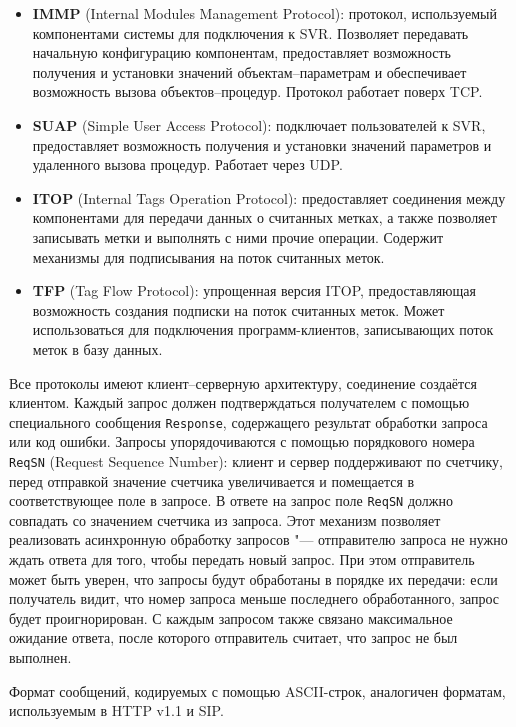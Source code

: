 \begin{itemize}
\item{\textbf{IMMP} (Internal Modules Management Protocol): протокол, используемый компонентами системы для подключения к SVR. Позволяет передавать начальную конфигурацию компонентам, предоставляет возможность получения и установки значений объектам--параметрам и обеспечивает возможность вызова объектов--процедур. Протокол работает поверх TCP.}
\item{\textbf{SUAP} (Simple User Access Protocol): подключает пользователей к SVR, предоставляет возможность получения и установки значений параметров и удаленного вызова процедур. Работает через UDP.}
\item{\textbf{ITOP} (Internal Tags Operation Protocol): предоставляет соединения между компонентами для передачи данных о считанных метках, а также позволяет записывать метки и выполнять с ними прочие операции. Содержит механизмы для подписывания на поток считанных меток.}
\item{\textbf{TFP} (Tag Flow Protocol): упрощенная версия ITOP, предоставляющая возможность создания подписки на поток считанных меток. Может использоваться для подключения программ-клиентов, записывающих поток меток в базу данных.}
\end{itemize}

Все протоколы имеют клиент--серверную архитектуру, соединение создаётся клиентом. Каждый запрос должен подтверждаться получателем с помощью специального сообщения \texttt{Response}, содержащего результат обработки запроса или код ошибки. Запросы упорядочиваются с помощью порядкового номера \texttt{ReqSN} (Request Sequence Number): клиент и сервер поддерживают по счетчику, перед отправкой значение счетчика увеличивается и помещается в соответствующее поле в запросе. В ответе на запрос поле \texttt{ReqSN} должно совпадать со значением счетчика из запроса. Этот механизм позволяет реализовать асинхронную обработку запросов "--- отправителю запроса не нужно ждать ответа для того, чтобы передать новый запрос. При этом отправитель может быть уверен, что запросы будут обработаны в порядке их передачи: если получатель видит, что номер запроса меньше последнего обработанного, запрос будет проигнорирован. С каждым запросом также связано максимальное ожидание ответа, после которого отправитель считает, что запрос не был выполнен.

Формат сообщений, кодируемых с помощью ASCII-строк, аналогичен форматам, используемым в HTTP v1.1 и SIP.


